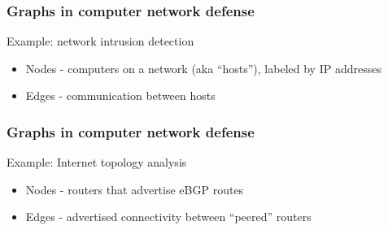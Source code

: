 \documentclass[11pt,table]{beamer}
\begin{document}

\appendix

\begin{frame}
\frametitle{Graphs in computer network defense}
Example: network intrusion detection
\bigskip
\begin{itemize}
  \item{Nodes - computers on a network (aka ``hosts''), labeled by IP addresses}
    \medskip
  \item{Edges - communication between hosts}
  \end{itemize}
  \end{frame}

   \begin{frame}
\frametitle{Graphs in computer network defense}
Example: Internet topology analysis
\bigskip
\begin{itemize}
  \item{Nodes - routers that advertise eBGP routes}
    \medskip
  \item{Edges - advertised connectivity between ``peered'' routers}
  \end{itemize}
  \end{frame}
\end{document}

